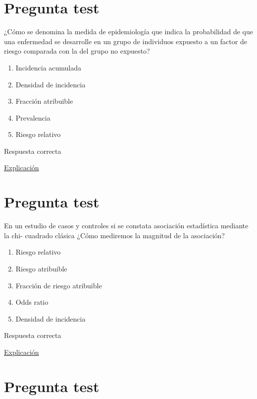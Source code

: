 \documentclass[
]{book}
\providecommand{\tightlist}{%
  \setlength{\itemsep}{0pt}\setlength{\parskip}{0pt}}
\begin{document}
\hypertarget{pregunta-test-157}{%
\section{Pregunta test}\label{pregunta-test-157}}

¿Cómo se denomina la medida de epidemiología que indica la probabilidad de que una enfermedad se desarrolle en un grupo de individuos expuesto a un factor de riesgo comparada con la del grupo no expuesto?

\begin{enumerate}
\def\labelenumi{\alph{enumi})}
\tightlist
\item
  Incidencia acumulada
\item
  Densidad de incidencia
\item
  Fracción atribuible
\item
  Prevalencia
\item
  Riesgo relativo
\end{enumerate}

Respuesta correcta

\href{https://es.wikipedia.org/wiki/Riesgo_relativo}{Explicación}

\hypertarget{pregunta-test-158}{%
\section{Pregunta test}\label{pregunta-test-158}}

En un estudio de casos y controles si se constata asociación estadística mediante la chi- cuadrado clásica ¿Cómo mediremos la magnitud de la asociación?

\begin{enumerate}
\def\labelenumi{\alph{enumi})}
\tightlist
\item
  Riesgo relativo
\item
  Riesgo atribuible
\item
  Fracción de riesgo atribuible
\item
  Odds ratio
\item
  Densidad de incidencia
\end{enumerate}

Respuesta correcta

\href{https://www.elsevier.es/es-revista-educacion-medica-71-articulo-el-odds-ratio-su-interpretacion-S1575181317300360}{Explicación}

\hypertarget{pregunta-test-159}{%
\section{Pregunta test}\label{pregunta-test-159}}
\end{document}
